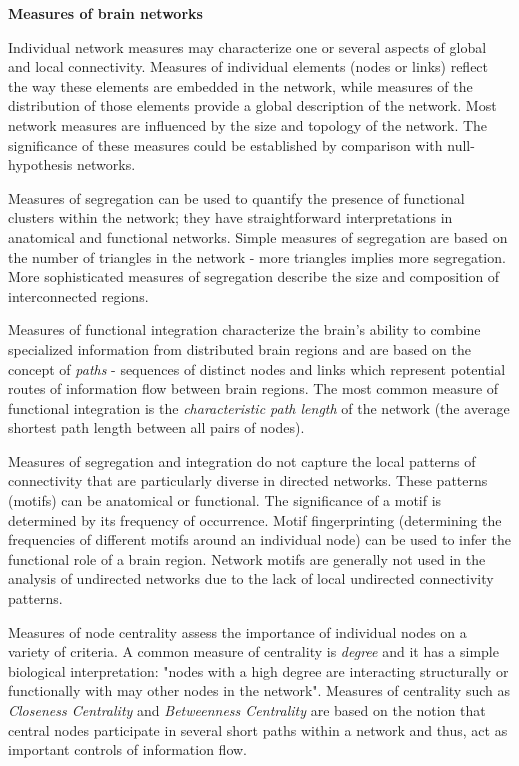 \documentclass[11pt, letterpaper]{article}
\begin{document}
\noindent\textbf{Measures of brain networks}

Individual network measures may characterize one or several aspects of global and local connectivity. Measures of 
individual elements (nodes or links) reflect the way these elements are embedded in the network, while measures of 
the distribution of those elements provide a global description of the network. Most network measures are influenced 
by the size and topology of the network. The significance of these measures could be established by comparison with 
null-hypothesis networks.

Measures of segregation can be used to quantify the presence of functional clusters within the network; they have 
straightforward interpretations in anatomical and functional networks. Simple measures of segregation are based on 
the number of triangles in the network - more triangles implies more segregation. More sophisticated measures of 
segregation describe the size and composition of interconnected regions.

Measures of functional integration characterize the brain's ability to combine specialized information from 
distributed brain regions and are based on the concept of \textit{paths} - sequences of distinct nodes and links 
which represent potential routes of information flow between brain regions. The most common measure of functional 
integration is the \textit{characteristic path length} of the network (the average shortest path length between 
all pairs of nodes).

Measures of segregation and integration do not capture the local patterns of connectivity that are particularly 
diverse in directed networks. These patterns (motifs) can be anatomical or functional. The significance of a motif 
is determined by its frequency of occurrence. Motif fingerprinting (determining the frequencies of different motifs 
around an individual node) can be used to infer the functional role of a brain region. Network motifs are generally 
not used in the analysis of undirected networks due to the lack of local undirected connectivity patterns.

Measures of node centrality assess the importance of individual nodes on a variety of criteria. A common measure of 
centrality is \textit{degree} and it has a simple biological interpretation:  "nodes with a high degree are interacting 
structurally or functionally with may other nodes in the network". Measures of centrality such as 
\textit{Closeness Centrality} and \textit{Betweenness Centrality} are based on the notion that central nodes participate 
in several short paths within a network and thus, act as important controls of information flow.\\
\end{document}
